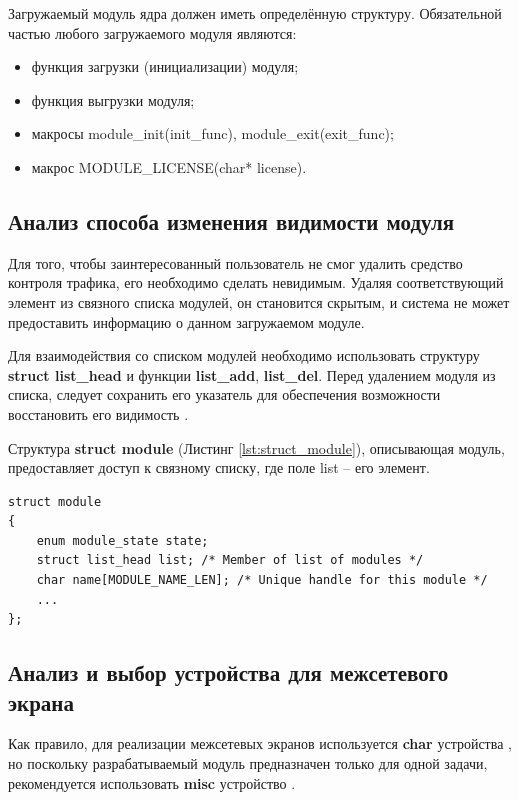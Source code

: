 Загружаемый модуль ядра должен иметь определённую структуру. Обязательной частью любого загружаемого модуля являются:
\begin{itemize}
	\item функция загрузки (инициализации) модуля;
	
	\item функция выгрузки модуля; 
	
	\item макросы module\_init(init\_func), module\_exit(exit\_func);
	
	\item макрос MODULE\_LICENSE(char* license). \newline
\end{itemize}

\subsection{Анализ способа изменения видимости модуля}
Для того, чтобы заинтересованный пользователь не смог удалить средство контроля трафика, его необходимо сделать невидимым. Удаляя соответствующий элемент из связного списка модулей, он становится скрытым, и система не может предоставить информацию о данном загружаемом модуле.

Для взаимодействия со списком модулей необходимо использовать структуру \textbf{struct list\_head} и функции \textbf{list\_add}, \textbf{list\_del}. Перед удалением модуля из списка, следует сохранить его указатель для обеспечения возможности восстановить его видимость \cite{hide}.

Структура \textbf{struct module} (Листинг \ref{lst:struct_module}), описывающая модуль, предоставляет доступ к связному списку, где поле list -- его элемент.
\begin{lstlisting}[caption = {struct module}, label=lst:struct_module]
struct module
{
	enum module_state state;
	struct list_head list; /* Member of list of modules */
	char name[MODULE_NAME_LEN]; /* Unique handle for this module */
	...
};
\end{lstlisting}

\subsection{Анализ и выбор устройства для межсетевого экрана}
Как правило, для реализации межсетевых экранов используется \textbf{char} устройства \cite{2nd}, но поскольку разрабатываемый модуль предназначен только для одной задачи, рекомендуется использовать \textbf{misc} устройство \cite{2nd,misc}.

